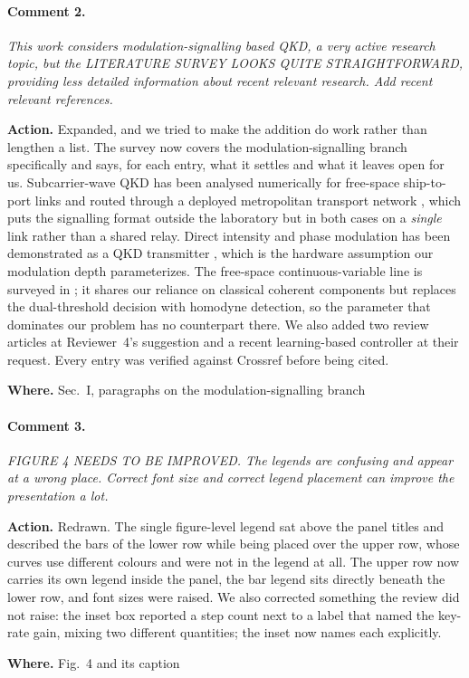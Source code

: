 \documentclass[10pt]{article}
\newcommand{\rev}[1]{\par\medskip\noindent\textit{#1}\par\smallskip}
\newcommand{\act}[2]{\noindent\textbf{Action.} #1\par\noindent\textbf{Where.} #2\par}
\begin{document}
\paragraph{Comment 2.}
\rev{This work considers modulation-signalling based QKD, a very active research topic, but the LITERATURE SURVEY LOOKS QUITE STRAIGHTFORWARD, providing less detailed information about recent relevant research. Add recent relevant references.}
\act{Expanded, and we tried to make the addition do work rather than lengthen a list. The survey now covers the modulation-signalling branch specifically and says, for each entry, what it settles and what it leaves open for us. Subcarrier-wave QKD has been analysed numerically for free-space ship-to-port links \cite{goncharov2025scw} and routed through a deployed metropolitan transport network \cite{tarabrina2023scw}, which puts the signalling format outside the laboratory but in both cases on a \emph{single} link rather than a shared relay. Direct intensity and phase modulation has been demonstrated as a QKD transmitter \cite{liu2026intensity}, which is the hardware assumption our modulation depth parameterizes. The free-space continuous-variable line is surveyed in \cite{kargina2026cvqkd}; it shares our reliance on classical coherent components but replaces the dual-threshold decision with homodyne detection, so the parameter that dominates our problem has no counterpart there. We also added two review articles at Reviewer~4's suggestion and a recent learning-based controller at their request. Every entry was verified against Crossref before being cited.}{Sec.~I, paragraphs on the modulation-signalling branch}

\paragraph{Comment 3.}
\rev{FIGURE 4 NEEDS TO BE IMPROVED. The legends are confusing and appear at a wrong place. Correct font size and correct legend placement can improve the presentation a lot.}
\act{Redrawn. The single figure-level legend sat above the panel titles and described the bars of the lower row while being placed over the upper row, whose curves use different colours and were not in the legend at all. The upper row now carries its own legend inside the panel, the bar legend sits directly beneath the lower row, and font sizes were raised. We also corrected something the review did not raise: the inset box reported a step count next to a label that named the key-rate gain, mixing two different quantities; the inset now names each explicitly.}{Fig.~4 and its caption}
\end{document}
